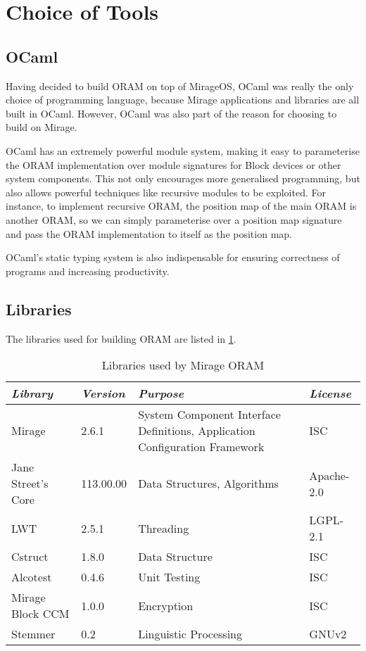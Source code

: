 \documentclass[12pt,a4paper,twoside,openright]{report}
\begin{document}
\section{Choice of Tools}

\subsection{OCaml}

Having decided to build ORAM on top of MirageOS, OCaml was really the only choice of programming language, because Mirage applications and libraries are all built in OCaml. However, OCaml was also part of the reason for choosing to build on Mirage.

OCaml has an extremely powerful module system, making it easy to parameterise the ORAM implementation over module signatures for Block devices or other system components. This not only encourages more generalised programming, but also allows powerful techniques like recursive modules to be exploited. For instance, to implement recursive ORAM, the position map of the main ORAM is another ORAM, so we can simply parameterise over a position map signature and pass the ORAM implementation to itself as the position map.

OCaml's static typing system is also indispensable for ensuring correctness of programs and increasing productivity.

\subsection{Libraries}
\label{subsec:libraries}

The libraries used for building ORAM are listed in \cref{tab:libraries}.

\begin{table}[h]
\centering
\begin{tabularx}{\textwidth}{|l|l|X|l|}
\hline
\textit{Library} & \textit{Version} & \textit{Purpose} & \textit{License} \\
\hline \hline
Mirage & 2.6.1 & System Component Interface Definitions, Application Configuration Framework & ISC \\
\hline
Jane Street's Core & 113.00.00 & Data Structures, Algorithms & Apache-2.0 \\
\hline
LWT & 2.5.1 & Threading & LGPL-2.1 \\
\hline
Cstruct & 1.8.0 & Data Structure & ISC \\
\hline
Alcotest & 0.4.6 & Unit Testing & ISC \\
\hline
Mirage Block CCM & 1.0.0 & Encryption & ISC \\
\hline
Stemmer & 0.2 & Linguistic Processing & GNUv2 \\
\hline
\end{tabularx}
\caption{Libraries used by Mirage ORAM}
\label{tab:libraries}
\end{table}
\end{document}
